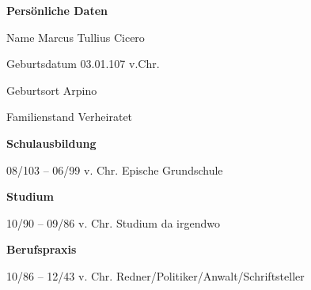 \begin{cv}
\vspace{15ex}\textbf{\Large Pers\"onliche Daten}\vspace{1ex}
\begin{labeling}{\hspace{15em}}
	\item [Name] Marcus Tullius Cicero
	\item [Geburtsdatum] 03.01.107 v.Chr.
	\item [Geburtsort] Arpino
	\item [Familienstand] Verheiratet
\end{labeling}
\null\vspace{2ex}\textbf{\Large Schulausbildung}\vspace{1ex}
\begin{labeling}{\hspace{15em}}
	\item [08/103 -- 06/99 v. Chr.] Epische Grundschule
\end{labeling}
\null\vspace{2ex}\textbf{\Large Studium}\vspace{1ex}
\begin{labeling}{\hspace{15em}}
	\item [10/90 -- 09/86 v. Chr.] Studium da irgendwo
\end{labeling}
\null\vspace{2ex}\textbf{\Large Berufspraxis}\vspace{1ex}
\begin{labeling}{\hspace{15em}}
	\item [10/86 -- 12/43 v. Chr.] Redner/Politiker/Anwalt/Schriftsteller
\end{labeling}
\end{cv}